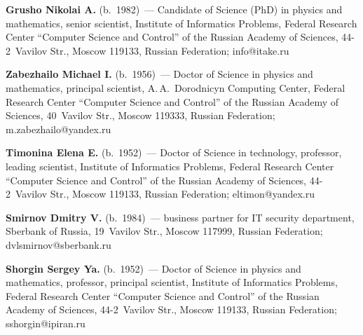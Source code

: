 \vspace*{3pt}

\noindent
\textbf{Grusho Nikolai A.} (b.\ 1982)~--- Candidate of Science (PhD) in physics and 
mathematics, senior scientist, Institute of Informatics Problems, Federal Research 
Center ``Computer Science and Control'' of the Russian Academy of Sciences,  
44-2~Vavilov Str., Moscow 119133, Russian Federation; \mbox{info@itake.ru}

\vspace*{3pt}

\noindent
\textbf{Zabezhailo Michael I.} (b.\ 1956)~--- Doctor of Science in physics and 
mathematics, principal scientist, A.\,A.~Dorodnicyn Computing Center, Federal 
Research Center ``Computer Science and Control'' of the Russian Academy of Sciences, 
40~Vavilov Str., Moscow 119333, Russian Federation; 
\mbox{m.zabezhailo@yandex.ru}

\vspace*{3pt}

\noindent
\textbf{Timonina Elena E.} (b.\ 1952)~--- Doctor of Science in technology, professor, 
leading scientist, Institute of Informatics Problems, Federal Research Center 
``Computer Science and Control'' of the Russian Academy of Sciences, 44-2~Vavilov 
Str., Moscow 119133, Russian Federation; \mbox{eltimon@yandex.ru}

\vspace*{3pt}

\noindent
\textbf{Smirnov Dmitry V.} (b.\ 1984)~--- business partner for IT security department, 
Sberbank of Russia, 19~Vavilov Str., Moscow 117999, Russian Federation; 
dvlsmirnov@sberbank.ru

\vspace*{3pt}

\noindent
\textbf{Shorgin Sergey Ya.} (b.\ 1952)~--- Doctor of Science in physics and 
mathematics, professor, principal scientist, Institute of Informatics Problems, Federal 
Research Center ``Computer Science and Control'' of the Russian Academy of Sciences, 
44-2~Vavilov Str., Moscow 119133, Russian Federation; \mbox{sshorgin@ipiran.ru}


\label{end\stat}

\renewcommand{\bibname}{\protect\rm Литература}    
   